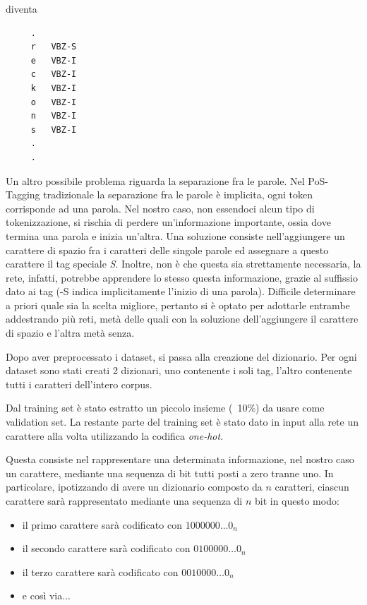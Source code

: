 diventa

\begin{center}
  \begin{minipage}{5cm}
    \begin{verbatim}
     .
     r   VBZ-S
     e   VBZ-I
     c   VBZ-I
     k   VBZ-I
     o   VBZ-I
     n   VBZ-I
     s   VBZ-I
     .
     .
    \end{verbatim}
  \end{minipage}
\end{center}

Un altro possibile problema riguarda la separazione fra le parole.
Nel PoS-Tagging tradizionale la separazione fra le parole \`e implicita, ogni token corrisponde ad una parola.
Nel nostro caso, non essendoci alcun tipo di tokenizzazione, si rischia di perdere un'informazione importante, ossia dove termina una parola e inizia un'altra.
Una soluzione consiste nell'aggiungere un carattere di spazio fra i caratteri delle singole parole ed assegnare a questo carattere il tag speciale \emph{S}.
Inoltre, non \`e che questa sia strettamente necessaria, la rete, infatti, potrebbe apprendere lo stesso questa informazione, grazie al suffissio dato ai tag (-S indica implicitamente l'inizio di una parola).
Difficile determinare a priori quale sia la scelta migliore, pertanto si \`e optato per adottarle entrambe addestrando pi\`u reti, met\`a delle quali con la soluzione dell'aggiungere il carattere di spazio e l'altra met\`a senza.

Dopo aver preprocessato i dataset, si passa alla creazione del dizionario.
Per ogni dataset sono stati creati 2 dizionari, uno contenente i soli tag, l'altro contenente tutti i caratteri dell'intero corpus.

Dal training set \`e stato estratto un piccolo insieme (~10\%) da usare come validation set.
La restante parte del training set \`e stato dato in input alla rete un carattere alla volta utilizzando la codifica \emph{one-hot}.

Questa consiste nel rappresentare una determinata informazione, nel nostro caso un carattere, mediante una sequenza di bit tutti posti a zero tranne uno.
In particolare, ipotizzando di avere un dizionario composto da $n$ caratteri, ciascun carattere sar\`a rappresentato mediante una sequenza di $n$ bit in questo modo:

\begin{itemize}
  \item il primo carattere sar\`a codificato con $1000000\dots0_{n}$
  \item il secondo carattere sar\`a codificato con $0100000\dots0_{n}$
  \item il terzo carattere sar\`a codificato con $0010000\dots0_{n}$
  \item e cos\`i via...
\end{itemize}


